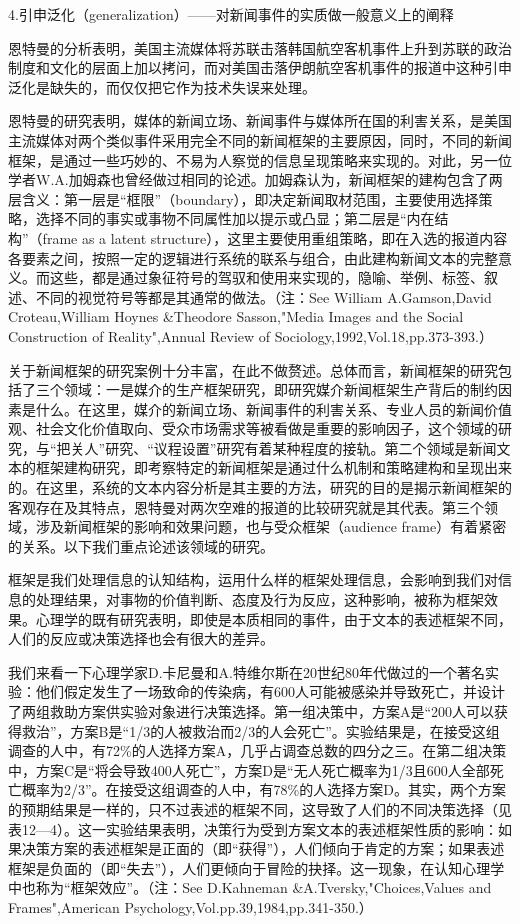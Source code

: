 \documentclass[UTF8,12pt]{ctexart}
\numberwithin{equation}{section} %
\numberwithin{figure}{section}
\numberwithin{table}{section}
\begin{document}
	
	
	4.引申泛化（generalization）——对新闻事件的实质做一般意义上的阐释
	
	恩特曼的分析表明，美国主流媒体将苏联击落韩国航空客机事件上升到苏联的政治制度和文化的层面上加以拷问，而对美国击落伊朗航空客机事件的报道中这种引申泛化是缺失的，而仅仅把它作为技术失误来处理。
	
	恩特曼的研究表明，媒体的新闻立场、新闻事件与媒体所在国的利害关系，是美国主流媒体对两个类似事件采用完全不同的新闻框架的主要原因，同时，不同的新闻框架，是通过一些巧妙的、不易为人察觉的信息呈现策略来实现的。对此，另一位学者W.A.加姆森也曾经做过相同的论述。加姆森认为，新闻框架的建构包含了两层含义：第一层是“框限”（boundary），即决定新闻取材范围，主要使用选择策略，选择不同的事实或事物不同属性加以提示或凸显；第二层是“内在结构”（frame as a latent structure），这里主要使用重组策略，即在入选的报道内容各要素之间，按照一定的逻辑进行系统的联系与组合，由此建构新闻文本的完整意义。而这些，都是通过象征符号的驾驭和使用来实现的，隐喻、举例、标签、叙述、不同的视觉符号等都是其通常的做法。（注：See William A.Gamson,David Croteau,William Hoynes \&Theodore Sasson,"Media Images and the Social Construction of Reality",Annual Review of Sociology,1992,Vol.18,pp.373-393.）
	
	关于新闻框架的研究案例十分丰富，在此不做赘述。总体而言，新闻框架的研究包括了三个领域：一是媒介的生产框架研究，即研究媒介新闻框架生产背后的制约因素是什么。在这里，媒介的新闻立场、新闻事件的利害关系、专业人员的新闻价值观、社会文化价值取向、受众市场需求等被看做是重要的影响因子，这个领域的研究，与“把关人”研究、“议程设置”研究有着某种程度的接轨。第二个领域是新闻文本的框架建构研究，即考察特定的新闻框架是通过什么机制和策略建构和呈现出来的。在这里，系统的文本内容分析是其主要的方法，研究的目的是揭示新闻框架的客观存在及其特点，恩特曼对两次空难的报道的比较研究就是其代表。第三个领域，涉及新闻框架的影响和效果问题，也与受众框架（audience frame）有着紧密的关系。以下我们重点论述该领域的研究。
	
	框架是我们处理信息的认知结构，运用什么样的框架处理信息，会影响到我们对信息的处理结果，对事物的价值判断、态度及行为反应，这种影响，被称为框架效果。心理学的既有研究表明，即使是本质相同的事件，由于文本的表述框架不同，人们的反应或决策选择也会有很大的差异。
	
	我们来看一下心理学家D.卡尼曼和A.特维尔斯在20世纪80年代做过的一个著名实验：他们假定发生了一场致命的传染病，有600人可能被感染并导致死亡，并设计了两组救助方案供实验对象进行决策选择。第一组决策中，方案A是“200人可以获得救治”，方案B是“1/3的人被救治而2/3的人会死亡”。实验结果是，在接受这组调查的人中，有72\%的人选择方案A，几乎占调查总数的四分之三。在第二组决策中，方案C是“将会导致400人死亡”，方案D是“无人死亡概率为1/3且600人全部死亡概率为2/3”。在接受这组调查的人中，有78\%的人选择方案D。其实，两个方案的预期结果是一样的，只不过表述的框架不同，这导致了人们的不同决策选择（见表12—4）。这一实验结果表明，决策行为受到方案文本的表述框架性质的影响：如果决策方案的表述框架是正面的（即“获得”），人们倾向于肯定的方案；如果表述框架是负面的（即“失去”），人们更倾向于冒险的抉择。这一现象，在认知心理学中也称为“框架效应”。（注：See D.Kahneman \&A.Tversky,"Choices,Values and Frames",American Psychology,Vol.pp.39,1984,pp.341-350.）
	
\end{document}

